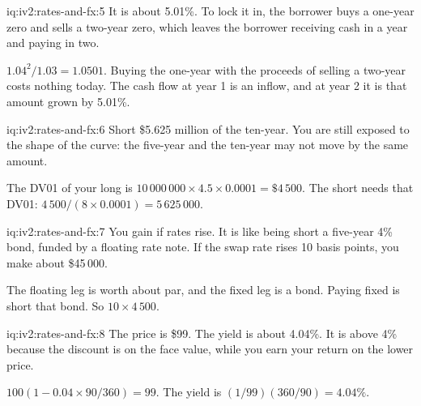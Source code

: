 \begin{solution}{iq:iv2:rates-and-fx:5}
It is about 5.01\%. To lock it in, the borrower buys a one-year zero and sells a two-year zero, which leaves the borrower receiving cash in a year and paying in two.

$1.04^2/1.03 = 1.0501$. Buying the one-year with the proceeds of selling a two-year costs nothing today. The cash flow at year 1 is an inflow, and at year 2 it is that amount grown by 5.01\%.

\end{solution}

\begin{solution}{iq:iv2:rates-and-fx:6}
Short \$5.625 million of the ten-year. You are still exposed to the shape of the curve: the five-year and the ten-year may not move by the same amount.

The DV01 of your long is $10\,000\,000 \times 4.5 \times 0.0001 = \$4\,500$. The short needs that DV01: $4\,500/(8 \times 0.0001) = 5\,625\,000$.

\end{solution}

\begin{solution}{iq:iv2:rates-and-fx:7}
You gain if rates rise. It is like being short a five-year 4\% bond, funded by a floating rate note. If the swap rate rises 10 basis points, you make about \$45\,000.

The floating leg is worth about par, and the fixed leg is a bond. Paying fixed is short that bond. So $10 \times 4\,500$.

\end{solution}

\begin{solution}{iq:iv2:rates-and-fx:8}
The price is \$99. The yield is about 4.04\%. It is above 4\% because the discount is on the face value, while you earn your return on the lower price.

$100(1 - 0.04 \times 90/360) = 99$. The yield is $(1/99)(360/90) = 4.04\%$.

\end{solution}

